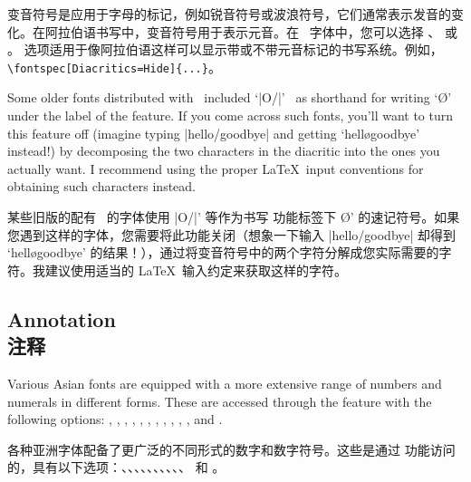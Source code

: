 \documentclass[a4paper]{l3doc}
\begin{document}
变音符号是应用于字母的标记，例如锐音符号或波浪符号，它们通常表示发音的变化。在阿拉伯语书写中，变音符号用于表示元音。在 \AAT\ 字体中，您可以选择 、 或 。  选项适用于像阿拉伯语这样可以显示带或不带元音标记的书写系统。例如，\verb|\fontspec[Diacritics=Hide]{...}|。


Some older fonts distributed with \MacOSX\ included `|O/|' \etc\ as shorthand for writing `\O' under the label of the  feature. If you come across such fonts, you'll
want to turn this feature off (imagine typing |hello/goodbye| and
getting `hell\o goodbye' instead!) by decomposing the two characters
in the diacritic into the ones you actually
want. I recommend using
the proper \LaTeX\ input conventions for obtaining such characters
instead.

某些旧版的配有 \MacOSX\ 的字体使用 |O/|' 等作为书写  功能标签下 \O' 的速记符号。如果您遇到这样的字体，您需要将此功能关闭（想象一下输入 |hello/goodbye| 却得到 `hell\o goodbye' 的结果！），通过将变音符号中的两个字符分解成您实际需要的字符。我建议使用适当的 \LaTeX\ 输入约定来获取这样的字符。


\subsection{Annotation\\注释}
Various Asian fonts are equipped with a more extensive range of
numbers and numerals in different forms. These are accessed through
the  feature with the following
options: ,
, , , ,
, , , ,
, , and .

各种亚洲字体配备了更广泛的不同形式的数字和数字符号。这些是通过  功能访问的，具有以下选项：、、、、、、、、、、 和 。
\end{document}
